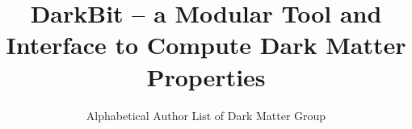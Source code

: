 %
%
%
%
%
%
\RequirePackage{fix-cm}
%
\documentclass[twocolumn,epjc3]{svjour3}  
%
\smartqed  %
%
\RequirePackage{graphicx}
%
%
\RequirePackage{latexsym}
%
%
%


\title{DarkBit -- a Modular Tool and Interface to Compute Dark Matter Properties%
}


\author{Alphabetical Author List of Dark Matter Group
}




